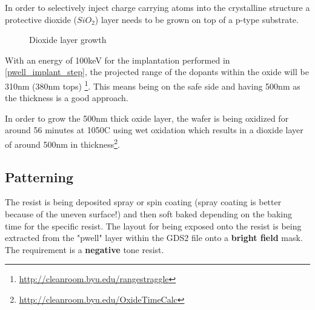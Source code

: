 In order to selectively inject charge carrying atoms into the crystalline structure a protective dioxide ($SiO_2$) layer needs to be grown on top of a p-type substrate.

\begin{figure}[H]
	\centering
	\begin{tikzpicture}[node distance = 3cm, auto, thick,scale=\CrossSectionOnly, every node/.style={transform shape}]
		
	\end{tikzpicture}
	\drawStepArrow{}
	\begin{tikzpicture}[node distance = 3cm, auto, thick,scale=\CrossSectionOnly, every node/.style={transform shape}]
		
	\end{tikzpicture}
	\caption{Dioxide layer growth}
\end{figure}

With an energy of 100keV for the implantation performed in \autoref{pwell_implant_step}, the projected range of the dopants within the oxide will be 310nm (380nm tops) \footnote{\url{http://cleanroom.byu.edu/rangestraggle}}.
This means being on the safe side and having 500nm as the thickness is a good approach.

In order to grow the 500nm thick oxide layer, the wafer is being oxidized for around 56 minutes at 1050\degree C using wet oxidation which results in a dioxide layer of around 500nm in thickness\footnote{\url{http://cleanroom.byu.edu/OxideTimeCalc}}.

\subsection{Patterning}
The resist is being deposited spray or spin coating (spray coating is better because of the uneven surface!) and then soft baked depending on the baking time for the specific resist.
The layout for being exposed onto the resist is being extracted from the "pwell" layer within the GDS2 file onto a \textbf{bright field} mask.
The requirement is a \textbf{negative} tone resist.

